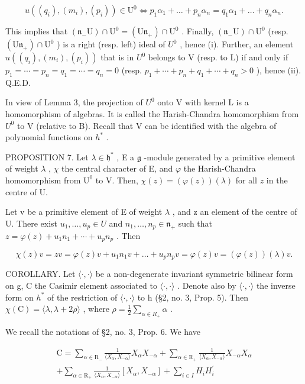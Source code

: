 \[
u \left(\left(q _ {i}\right), \left(m _ {i}\right), \left(p _ {i}\right)\right) \in \mathrm{U} ^ {0} \Longleftrightarrow p _ {1} \alpha_ {1} + \dots + p _ {n} \alpha_ {n} = q _ {1} \alpha_ {1} + \dots + q _ {n} \alpha_ {n}.
\]

This implies that \((\mathfrak{n}_{-}\mathrm{U})\cap\mathrm{U}^{0}=(\mathrm{U}\mathfrak{n}_{+})\cap\mathrm{U}^{0}\) . Finally, \((\mathfrak{n}_{-}\mathrm{U})\cap\mathrm{U}^{0}\) (resp. \((\mathrm{U}\mathfrak{n}_{+})\cap\mathrm{U}^{0}\) ) is a right (resp. left) ideal of \(U^{0}\) , hence (i). Further, an element \(u((q_{i}),(m_{i}),(p_{i}))\) that is in \(U^{0}\) belongs to V (resp. to L) if and only if \(p_{1}=\cdots=p_{n}=q_{1}=\cdots=q_{n}=0\) (resp. \(p_{1}+\cdots+p_{n}+q_{1}+\cdots+q_{n}>0\) ), hence (ii). Q.E.D.

In view of Lemma 3, the projection of \(U^{0}\) onto V with kernel L is a homomorphism of algebras. It is called the Harish-Chandra homomorphism from \(U^{0}\) to V (relative to B). Recall that V can be identified with the algebra of polynomial functions on \(h^{*}\) .

PROPOSITION 7. Let \(\lambda \in \mathfrak{h}^*\) , E a \(\mathfrak{g}\) -module generated by a primitive element of weight \(\lambda\) , \(\chi\) the central character of E, and \(\varphi\) the Harish-Chandra homomorphism from \(\mathrm{U}^0\) to V. Then, \(\chi(z) = (\varphi(z))(\lambda)\) for all \(z\) in the centre of U.

Let v be a primitive element of E of weight \(\lambda\) , and z an element of the centre of U. There exist \(u_{1},\ldots,u_{p}\in U\) and \(n_{1},\ldots,n_{p}\in\mathfrak{n}_{+}\) such that \(z=\varphi(z)+u_{1}n_{1}+\cdots+u_{p}n_{p}\) . Then

\[
\chi (z) v = z v = \varphi (z) v + u _ {1} n _ {1} v + \dots + u _ {p} n _ {p} v = \varphi (z) v = (\varphi (z)) (\lambda) v.
\]

COROLLARY. Let \(\langle\cdot,\cdot\rangle\) be a non-degenerate invariant symmetric bilinear form on g, C the Casimir element associated to \(\langle\cdot,\cdot\rangle\) . Denote also by \(\langle\cdot,\cdot\rangle\) the inverse form on \(h^{*}\) of the restriction of \(\langle\cdot,\cdot\rangle\) to h (§2, no. 3, Prop. 5). Then \(\chi(\mathrm{C})=\langle\lambda,\lambda+2\rho\rangle\) , where \(\rho=\frac{1}{2}\sum_{\alpha\in R_{+}}\alpha\) .

We recall the notations of §2, no. 3, Prop. 6. We have

\[
\begin{array}{r} \mathrm{C} = \sum_ {\alpha \in \mathrm{R} _ {-}} \frac {1}{\langle X _ {\alpha} , X _ {- \alpha} \rangle} X _ {\alpha} X _ {- \alpha} + \sum_ {\alpha \in \mathrm{R} _ {+}} \frac {1}{\langle X _ {\alpha} , X _ {- \alpha} \rangle} X _ {- \alpha} X _ {\alpha} \\ + \sum_ {\alpha \in \mathrm{R} _ {+}} \frac {1}{\langle X _ {\alpha} , X _ {- \alpha} \rangle} [ X _ {\alpha}, X _ {- \alpha} ] + \sum_ {i \in I} H _ {i} H _ {i} ^ {\prime} \end{array}
\]

